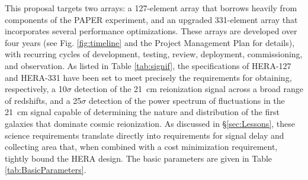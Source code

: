 \documentclass[ars]{copernicus}
\begin{document}
This proposal targets two arrays: a 127-element array that borrows heavily
from components of the PAPER experiment, and an upgraded 331-element array that
incorporates several performance optimizations.  
These arrays are developed over four years (see Fig. \ref{fig:timeline} and the Project Management Plan for details),
with recurring cycles of development, testing, review, deployment, commissioning, and observation.
As listed in Table \ref{tab:signif}, the specifications of HERA-127
and HERA-331 have been set to meet precisely the requirements for obtaining,
respectively, a 10$\sigma$ detection of the 21~cm reionization signal across a broad range of redshifts, and a
25$\sigma$ detection of the power spectrum of fluctuations in the 21~cm signal
capable of determining the nature and distribution of the first galaxies that
dominate cosmic reionization.  
As discussed in
\S\ref{sec:Lessons}, these science requirements translate directly into
requirements for signal delay and collecting area that, when 
combined with a cost minimization requirement, tightly
bound the HERA design.  The basic parameters are given in Table \ref{tab:BasicParameters}.
\end{document}
